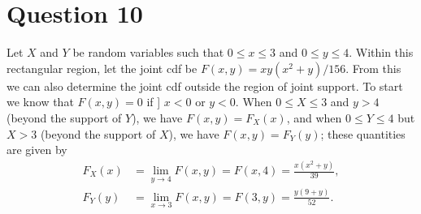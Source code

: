 \documentclass[10pt]{article}
\begin{document}
\section{Question 10} \noindent
Let \(X\) and \(Y\) be random variables such that \(0 \le x \le 3\) and \(0 \le y \le 4\). Within this rectangular region, let the joint cdf be 
\(F(x,y) = xy(x^2+y)/156\). From this we can also determine the joint cdf outside the region of joint support. To start we know that \(F(x,y) = 0\) if ]
\(x < 0\) or \(y < 0\). When \(0 \le X \le 3\) and \(y > 4\) (beyond the support of \(Y\)), we have \(F(x,y) = F_X(x)\), and when 
\(0 \le Y \le 4\) but \(X > 3\) (beyond the support of \(X\)), we have \(F(x,y) = F_Y(y)\); these quantities are given by 
\begin{align*}
    F_X(x) &= \lim_{y \to 4} F(x,y) = F(x,4) = \frac{x(x^2+y)}{39}, \\
    F_Y(y) &= \lim_{x \to 3} F(x,y) = F(3,y) = \frac{y(9 + y)}{52}.
\end{align*}
\end{document}
